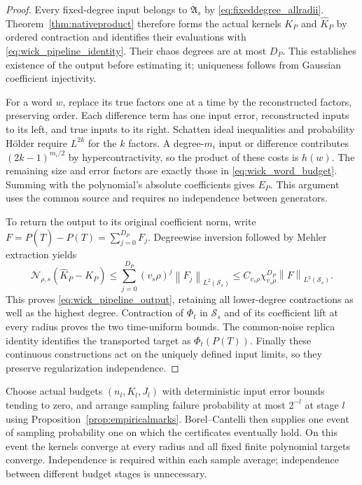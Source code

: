 \documentclass[11pt,a4paper]{amsart}
\numberwithin{equation}{section}
\theoremstyle{definition}
\theoremstyle{remark}
\newcommand{\Sch}{\mathcal S}
\newcommand{\Alg}{\mathfrak A}
\newcommand{\norm}[1]{\left\lVert#1\right\rVert}
\newcommand{\Nn}[2]{\mathcal N_{#1,s}(#2)}
\begin{document}
\begin{proof}
Every fixed-degree input belongs to $\Alg_s$ by \eqref{eq:fixeddegree_allradii}. Theorem~\ref{thm:nativeproduct} therefore forms the actual kernels $K_P$ and $\widehat K_P$ by ordered contraction and identifies their evaluations with \eqref{eq:wick_pipeline_identity}. Their chaos degrees are at most $D_P$. This establishes existence of the output before estimating it; uniqueness follows from Gaussian coefficient injectivity.

For a word $w$, replace its true factors one at a time by the reconstructed factors, preserving order. Each difference term has one input error, reconstructed inputs to its left, and true inputs to its right. Schatten ideal inequalities and probability H\"older require $L^{2k}$ for the $k$ factors. A degree-$m_i$ input or difference contributes $(2k-1)^{m_i/2}$ by hypercontractivity, so the product of these costs is $h(w)$. The remaining size and error factors are exactly those in \eqref{eq:wick_word_budget}. Summing with the polynomial's absolute coefficients gives $E_P$. This argument uses the common source and requires no independence between generators.

To return the output to its original coefficient norm, write
$F=P(\widehat T)-P(T)=\sum_{j=0}^{D_P}F_j$. Degreewise inversion followed by Mehler extraction yields
\[
 \Nn\rho{\widehat K_P-K_P}
 \le\sum_{j=0}^{D_P}(v_s\rho)^j\norm{F_j}_{L^2(\Sch_s)}
 \le C_{v_s\rho}\chi_{v_s\rho}^{D_P}\norm F_{L^2(\Sch_s)}.
\]
This proves \eqref{eq:wick_pipeline_output}, retaining all lower-degree contractions as well as the highest degree. Contraction of $\Phi_t$ in $\Sch_s$ and of its coefficient lift at every radius proves the two time-uniform bounds. The common-noise replica identity identifies the transported target as $\Phi_t(P(T))$. Finally these continuous constructions act on the uniquely defined input limits, so they preserve regularization independence.
\end{proof}

Choose actual budgets $(n_l,K_l,J_l)$ with deterministic input error bounds tending to zero, and arrange sampling failure probability at most $2^{-l}$ at stage $l$ using Proposition~\ref{prop:empiricalmarks}. Borel--Cantelli then supplies one event of sampling probability one on which the certificates eventually hold. On this event the kernels converge at every radius and all fixed finite polynomial targets converge. Independence is required within each sample average; independence between different budget stages is unnecessary.
\end{document}
